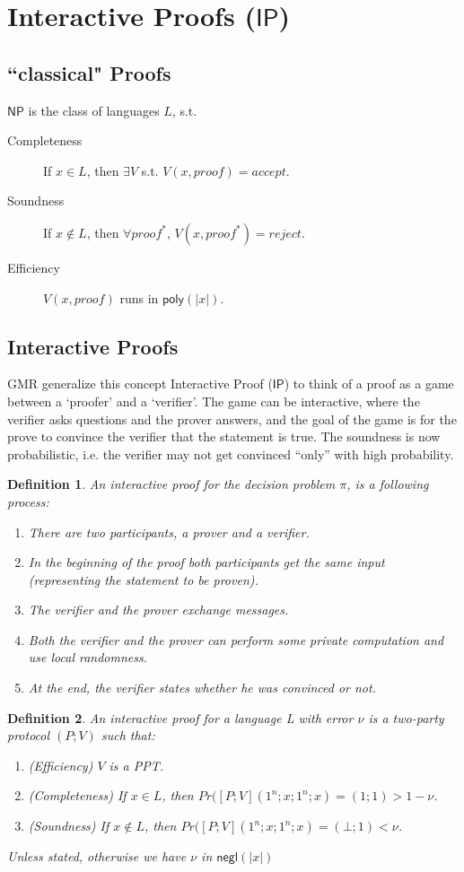 \documentclass[11pt]{article}
\newcommand{\class}[1]{{\ensuremath{\mathsf{#1}}}}
\newcommand{\np}{\class{NP}}
\newcommand{\ip}{\class{IP}}
\newcommand{\negl}{\class{negl}}
\newcommand{\poly}{\class{poly}}
\newtheorem{definition}{Definition}[section]
\begin{document}
\section{Interactive Proofs ($\ip$)}
\subsection{``classical" Proofs}
$\np$ is the class of languages $L$, s.t.
\begin{description}
\item[Completeness] If $x\in L$, then $\exists V$ s.t. $V(x, proof) = accept$. 
\item[Soundness] If $x\notin L$, then $\forall proof^*$, $V(x, proof^*) = reject$.
\item[Efficiency] $V(x, proof)$ runs in $\poly(|x|)$.
\end{description} 
\subsection{Interactive Proofs}
GMR generalize this concept Interactive Proof ($\ip$) to think of a proof as a game between a `proofer' and a `verifier'. The game can be interactive, where the verifier asks questions and the prover answers, and the goal of the game is for the prove to convince the verifier that the statement is true. The soundness is now probabilistic, i.e. the verifier may not get convinced ``only'' with high probability.


\begin{definition}
An interactive proof for the decision problem $\pi$, is a following process:
\begin{enumerate}
\item There are two participants, a prover and a verifier.
\item In the beginning of the proof both participants get the same input (representing the statement
to be proven).
\item The verifier and the prover exchange messages.
\item Both the verifier and the prover can perform some private computation and use local randomness.
\item At the end, the verifier states whether he was convinced or not.
\end{enumerate}
\end{definition}

\begin{definition}
An interactive proof for a language L with error $\nu$ is a two-party protocol $(P;V)$ such that:
\begin{enumerate}
\item (Efficiency) $V$ is a PPT.
\item (Completeness) If $x \in L$, then $Pr([P; V](1^n; x; 1^n; x) = (1; 1) > 1 - \nu$.
\item (Soundness) If $x \notin L$, then $Pr([P; V](1^n; x; 1^n; x) = (\bot; 1) < \nu$.
\end{enumerate}
Unless stated, otherwise we have $\nu$ in $\negl(|x|)$
\end{definition}
\end{document}
